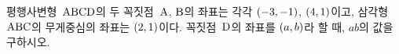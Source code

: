 평행사변형~$\mathrm{ABCD}$의 두 꼭짓점~$\mathrm{A}$, $\mathrm{B}$의 좌표는 각각 $(-3{,}\mkern3mu\mathopen{}-1)$, $(4{,}\mkern3mu\mathopen{}1)$이고, 삼각형~$\mathrm{ABC}$의 무게중심의 좌표는 $(2{,}\mkern3mu\mathopen{}1)$이다. 꼭짓점~$\mathrm{D}$의 좌표를 $(a{,}\mkern3mu\mathopen{}b)$라 할 때, $ab$의 값을 구하시오.
